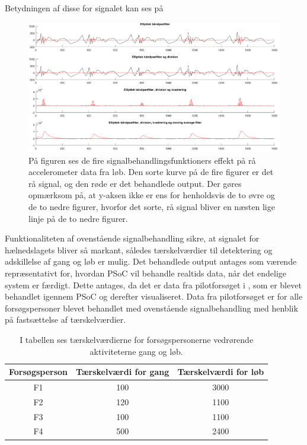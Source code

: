 Betydningen af disse for signalet kan ses på 
\begin{figure}[H]
	\centering
	\includegraphics[scale=0.37]{figures/cDesign/signalbehandling_psoc.png}
	\caption{På figuren ses de fire signalbehandlingsfunktioners effekt på rå accelerometer data fra løb. Den sorte kurve på de fire figurer er det rå signal, og den røde er det behandlede output. Der gøres opmærksom på, at y-aksen ikke er ens for henholdsvis de to øvre og de to nedre figurer, hvorfor det sorte, rå signal bliver en næsten lige linje på de to nedre figurer.}
	\label{fig:algoritme_cykling2}
\end{figure}
Funktionaliteten af ovenstående signalbehandling sikre, at signalet for hælnedslagets bliver så markant, således tærskelværdier til detektering og adskillelse af gang og løb er mulig. Det behandlede output antages som værende repræsentativt for, hvordan PSoC vil behandle realtids data, når det endelige system er færdigt. Dette antages, da det er data fra pilotforsøget i , som er blevet behandlet igennem PSoC og derefter visualiseret. Data fra pilotforsøget er for alle forsøgspersoner blevet behandlet med ovenstående signalbehandling med henblik på fastsættelse af tærskelværdier. 
\begin{table}[H]
	\centering
	\begin{tabular}{ccc}
		\hline
		\rowcolor[HTML]{C0C0C0} 
		Forsøgsperson & Tærskelværdi for gang & Tærskelværdi for løb \\ \hline
		\rowcolor[HTML]{FFFFFF} 
		F1 & 100 & 3000 \\ \hline
		\rowcolor[HTML]{FFFFFF} 
		F2 & 120 & 1100 \\ \hline
		\rowcolor[HTML]{FFFFFF} 
		F3 & 100 & 1100 \\ \hline
		\rowcolor[HTML]{FFFFFF} 
		F4 & 500 & 2400 \\ \hline
	\end{tabular}
	\caption{I tabellen ses tærskelværdierne for forsøgspersonerne vedrørende aktiviteterne gang og løb.}
	\label{tab:individuel_taerskel}
\end{table}\vspace{-0.5cm}
